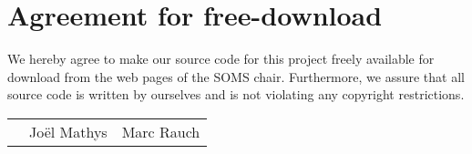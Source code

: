 \documentclass[11pt]{article}
\begin{document}

\newpage


\newpage
\section*{Agreement for free-download}
\bigskip


\bigskip


\large We hereby agree to make our source code for this project freely available for download from the web pages of the SOMS chair. Furthermore, we assure that all source code is written by ourselves and is not violating any copyright restrictions.

\begin{center}

\bigskip


\bigskip


\begin{tabular}{@{}p{3.3cm}@{}p{6cm}@{}@{}p{6cm}@{}}
\begin{minipage}{3cm}

\end{minipage}
&
\begin{minipage}{6cm}
\vspace{2mm} \large Jo\"el Mathys

 \vspace{\baselineskip}

\end{minipage}
&
\begin{minipage}{6cm}

\large Marc Rauch 

\end{minipage}
\end{tabular}


\end{center}
\newpage







\tableofcontents

\newpage

\end{document}
